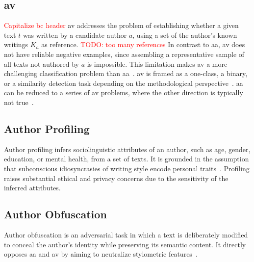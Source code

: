 \subsection{\Acl{av}}
\textcolor{red}{Capitalize bc header}
\ac{av} addresses the problem of establishing whether a given text $t$ was written by a candidate author $a$, using a set of the author’s known writings $K_a$ as reference. 
\textcolor{red}{TODO: too many references}
In contrast to \ac{aa}, \ac{av} does not have reliable negative examples, since assembling a representative sample of all texts not authored by 
$a$ is impossible. 
This limitation makes \ac{av} a more challenging classification problem than \ac{aa}~\citep{llm_detection_av_2025,neal_surveying_2018,koppel_authorship_2004}.
\ac{av} is framed as a one-class, a binary, or a similarity detection task depending on the methodological perspective~\citep{neal_surveying_2018,koppel_authorship_2004}.  
\ac{aa} can be reduced to a series of \ac{av} problems, where the other direction is typically not true~\citep{barlas_cross_domain_2020,tyo_state_2022}.


\subsection{Author Profiling}
Author profiling infers sociolinguistic attributes of an author, such as age, gender, education, or mental health, from a set of texts. 
It is grounded in the assumption that subconscious idiosyncrasies of writing style encode personal traits~\citep{emmery_adversarial_2021,stamatatos_survey_2009,elmanarelbouanani_authorship_2014}. 
Profiling raises substantial ethical and privacy concerns due to the sensitivity of the inferred attributes.

\subsection{Author Obfuscation}
Author obfuscation is an adversarial task in which a text is deliberately modified to conceal the author's identity while preserving its semantic content. 
It directly opposes \ac{aa} and \ac{av} by aiming to neutralize stylometric features~\citep{bischoff_importance_2020,bevendorff_divergence_based_2020,gohsen_task_oriented_2024}. 

